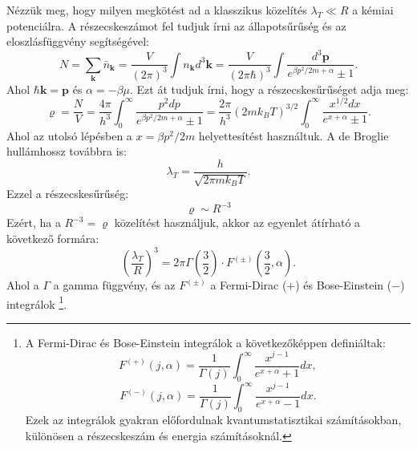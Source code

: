 \documentclass[../main.tex]{subfiles}
\begin{document}
Nézzük meg, hogy milyen megkötést ad a klasszikus közelítés $\lambda_T \ll R$ a kémiai potenciálra. A részecskeszámot fel tudjuk írni az állapotsűrűség és az eloszlásfüggvény segítségével:
\begin{equation}
    N = \sum_\mathbf{k} \bar{n}_\mathbf{k} = \frac{V}{(2\pi)^3} \int n_\mathbf{k} d^3 \mathbf{k} = \frac{V}{(2\pi \hbar)^3} \int \frac{d^3 \mathbf{p}}{e^{\beta p^2/2m + \alpha} \pm 1}.
\end{equation}
Ahol $\hbar \mathbf{k} = \mathbf{p}$ és $\alpha = -\beta \mu$. Ezt át tudjuk írni, hogy a részecskesűrűséget adja meg:
\begin{equation}
    \varrho = \frac{N}{V} = \frac{4 \pi}{h^3} \int_0^{\infty} \frac{p^2 dp}{e^{\beta p^2/2m + \alpha} \pm 1} = \frac{2 \pi}{h^3} (2 m k_B T)^{3/2} \int_0^{\infty} \frac{x^{1/2} dx}{e^{x + \alpha} \pm 1}.
\end{equation}
Ahol az utolsó lépésben a $x = \beta p^2/2m$ helyettesítést használtuk. A de Broglie hullámhossz továbbra is:
\begin{equation}
    \lambda_T = \frac{h}{\sqrt{2 \pi m k_B T}}.
\end{equation}
Ezzel a részecskesűrűség:
\begin{equation}
    \varrho \sim R^{-3}
\end{equation}
Ezért, ha a $R^{-3} = \varrho$ közelítést használjuk, akkor az egyenlet átírható a következő formára:
\begin{equation}
    \left(\frac{\lambda_T}{R}\right)^3 = 2\pi \Gamma(\frac{3}{2}) \cdot F^{(\pm)}(\frac{3}{2}, \alpha).
\end{equation}
Ahol a $\Gamma$ a gamma függvény, és az $F^{(\pm)}$ a Fermi-Dirac ($+$) és Bose-Einstein ($-$) integrálok
\footnote{
    A Fermi-Dirac és Bose-Einstein integrálok a következőképpen definiáltak:
    \begin{equation*}
        F^{(+)}(j, \alpha) = \frac{1}{\Gamma(j)} \int_0^{\infty} \frac{x^{j-1}}{e^{x + \alpha} + 1} dx,
    \end{equation*}
    \begin{equation*}
        F^{(-)}(j, \alpha) = \frac{1}{\Gamma(j)} \int_0^{\infty} \frac{x^{j-1}}{e^{x + \alpha} - 1} dx.
    \end{equation*}
    Ezek az integrálok gyakran előfordulnak kvantumstatisztikai számításokban, különösen a részecskeszám és energia számításoknál.
}.
\end{document}
